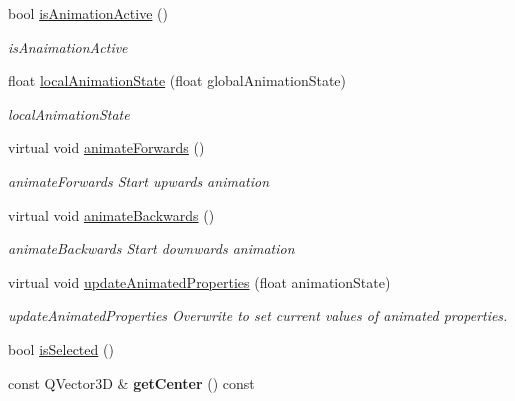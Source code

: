 \begin{DoxyCompactItemize}
bool \mbox{\hyperlink{class_g_l_body_a78e66df2ed6e8277d3363054b0ad0f2e}{is\+Animation\+Active}} ()
\begin{DoxyCompactList}\small\item\em is\+Anaimation\+Active \end{DoxyCompactList}\item 
float \mbox{\hyperlink{class_g_l_body_a30ff6f538a3966b06b2f07739070d14d}{local\+Animation\+State}} (float global\+Animation\+State)
\begin{DoxyCompactList}\small\item\em local\+Animation\+State \end{DoxyCompactList}\item 
\mbox{\label{class_g_l_body_aebb22dadd619ce98ca7c72d3970e65c9}} 
virtual void \mbox{\hyperlink{class_g_l_body_aebb22dadd619ce98ca7c72d3970e65c9}{animate\+Forwards}} ()
\begin{DoxyCompactList}\small\item\em animate\+Forwards Start upwards animation \end{DoxyCompactList}\item 
\mbox{\label{class_g_l_body_abb7d94cef839384559975654a9729a2f}} 
virtual void \mbox{\hyperlink{class_g_l_body_abb7d94cef839384559975654a9729a2f}{animate\+Backwards}} ()
\begin{DoxyCompactList}\small\item\em animate\+Backwards Start downwards animation \end{DoxyCompactList}\item 
\mbox{\label{class_g_l_body_a13dc56abce31b668719ff6cc53e1970a}} 
virtual void \mbox{\hyperlink{class_g_l_body_a13dc56abce31b668719ff6cc53e1970a}{update\+Animated\+Properties}} (float animation\+State)
\begin{DoxyCompactList}\small\item\em update\+Animated\+Properties Overwrite to set current values of animated properties. \end{DoxyCompactList}\item 
bool \mbox{\hyperlink{class_g_l_body_aed7512fc5612d8a8a00b49110b4fc68d}{is\+Selected}} ()
\item 
\mbox{\label{class_g_l_body_a80879471b9a5e1fd66dd7191c161d92c}} 
const Q\+Vector3D \& {\bfseries get\+Center} () const

\end{DoxyCompactItemize}
